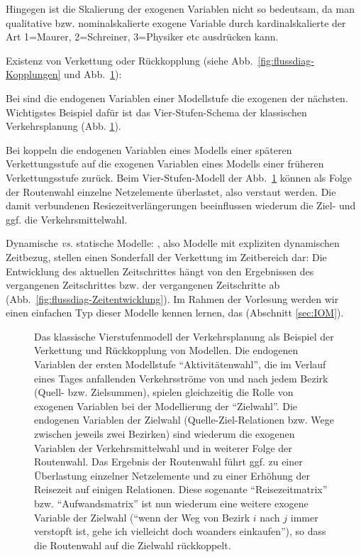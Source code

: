 Hingegen ist die Skalierung der exogenen Variablen nicht so
bedeutsam, da man qualitative bzw. nominalskalierte exogene Variable
durch kardinalskalierte  der Art 1=Maurer, 2=Schreiner,
3=Physiker etc ausdr\"ucken kann.

\item Existenz von Verkettung oder R\"uckkopplung (siehe
Abb.~\ref{fig:flussdiag-Kopplungen} und Abb.~\ref{fig:vierstufenmodell}):
\bi
\item Bei 
 sind die endogenen Variablen einer Modellstufe die exogenen der
n\"achsten. Wichtigstes Beispiel daf\"ur ist das Vier-Stufen-Schema der
klassischen Verkehrsplanung (Abb. \ref{fig:vierstufenmodell}).
\item Bei  koppeln die endogenen
Variablen   
eines Modells einer sp\"ateren Verkettungsstufe auf die exogenen
Variablen eines Modells einer fr\"uheren Verkettungsstufe zur\"uck. Beim
Vier-Stufen-Modell der Abb.~\ref{fig:vierstufenmodell} k\"onnen als
Folge der Routenwahl einzelne Netzelemente \"uberlastet, also verstaut
 werden. Die damit verbundenen Resiezeitverl\"angerungen
 beeinflussen wiederum die Ziel- und
ggf. die Verkehrsmittelwahl.
\ei

\item Dynamische \textit{vs.} statische Modelle: , also Modelle mit expliziten dynamischen Zeitbezug, stellen
einen Sonderfall der Verkettung im Zeitbereich dar: Die
Entwicklung des aktuellen Zeitschrittes h\"angt von den Ergebnissen des
vergangenen Zeitschrittes bzw. der vergangenen Zeitschritte ab
(Abb.~\ref{fig:flussdiag-Zeitentwicklung}).
Im Rahmen der Vorlesung werden wir einen einfachen Typ dieser Modelle
kennen lernen, das  (Abschnitt
\ref{sec:IOM}). 

\ei



\begin{figure}[t!]
\caption{\label{fig:vierstufenmodell}Das klassische Vierstufenmodell
der Verkehrsplanung als Beispiel der Verkettung und R\"uckkopplung von
Modellen. Die endogenen Variablen der ersten Modellstufe 
``Aktivit\"atenwahl'', die im Verlauf eines Tages anfallenden
Verkehrsstr\"ome von und nach jedem
Bezirk (Quell- bzw. Zielsummen), spielen gleichzeitig   die Rolle von
exogenen Variablen  
bei der Modellierung der ``Zielwahl''. Die endogenen Variablen der
Zielwahl (Quelle-Ziel-Relationen bzw. 
Wege zwischen jeweils zwei Bezirken) sind wiederum die
exogenen Variablen der Verkehrsmittelwahl und in weiterer Folge der
Routenwahl. Das Ergebnis der Routenwahl f\"uhrt ggf. zu einer
\"Uberlastung einzelner Netzelemente und zu einer Erh\"ohung der
Reisezeit auf einigen Relationen. Diese sogenante ``Reisezeitmatrix''
bzw. ``Aufwandsmatrix'' ist nun wiederum eine weitere exogene Variable
der Zielwahl (``wenn der Weg von Bezirk $i$ nach $j$ immer verstopft ist, gehe
ich vielleicht doch woanders einkaufen''), so dass die Routenwahl auf
die Zielwahl r\"uckkoppelt.
}
\end{figure}


